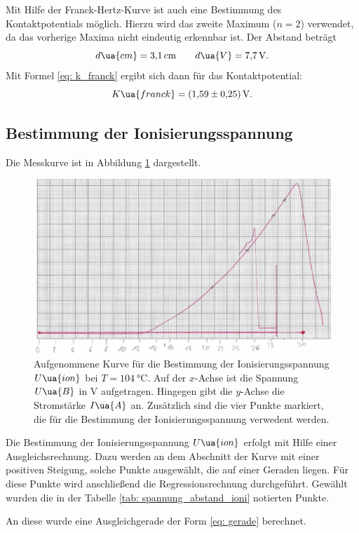 Mit Hilfe der Franck-Hertz-Kurve ist auch eine Bestimmung des Kontaktpotentials
möglich. Hierzu wird das zweite Maximum ($n=2$) verwendet, da das vorherige Maxima
nicht eindeutig erkennbar ist. Der Abstand beträgt
\begin{equation*}
  d\ua{cm}=\SI{3.1}{\centi\meter} \qquad d\ua{V}=\SI{7.7}{\volt}.
\end{equation*}
Mit Formel \eqref{eq: k_franck} ergibt sich dann für das Kontaktpotential:
\begin{equation}
  \label{eq:k_frank}
  K\ua{franck}= \SI{1.59\pm0.25}{\volt}.
\end{equation}
\FloatBarrier
\subsection{Bestimmung der Ionisierungsspannung}
\FloatBarrier
Die Messkurve ist in Abbildung \ref{fig: messkurve_ioni} dargestellt.
\begin{figure}
  \centering
  \includegraphics[width=0.8 \textwidth]{./pics/ionisierungsenergie.png}
  \caption{Aufgenommene Kurve für die Bestimmung der Ionisierungsspannung $U\ua{ion}$ bei $T=\SI{104}{\celsius}$. Auf der $x$-Achse ist die Spannung $U\ua{B}$ in $\si{\volt}$ aufgetragen.
          Hingegen gibt die $y$-Achse die Stromstärke $I\ua{A}$ an. Zusätzlich sind die vier Punkte markiert, die für die Bestimmung der Ionisierungsspannung verwedent werden.}
  \label{fig: messkurve_ioni}
\end{figure}
Die Bestimmung der Ionisierungsspannung $U\ua{ion}$ erfolgt mit Hilfe einer Ausgleichsrechnung. Dazu werden an dem Abschnitt der Kurve mit einer positiven Steigung,
solche Punkte ausgewählt, die auf einer Geraden liegen. Für diese Punkte wird anschließend die Regressionsrechnung durchgeführt.
Gewählt wurden die in der Tabelle \ref{tab: spannung_abstand_ioni} notierten Punkte.

An diese wurde eine Ausgleichgerade der Form \eqref{eq: gerade} berechnet.
